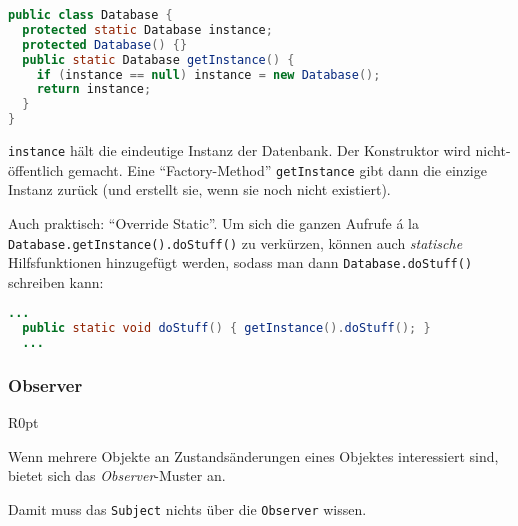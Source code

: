 \documentclass{panikzettel}
\begin{document}
\begin{lstlisting}[language=Java]
public class Database {
  protected static Database instance;
  protected Database() {}
  public static Database getInstance() {
    if (instance == null) instance = new Database();
    return instance;
  }
}
\end{lstlisting}

\lstinline{instance} hält die eindeutige Instanz der Datenbank.
Der Konstruktor wird nicht-öffentlich gemacht.
Eine ``Factory-Method'' \lstinline{getInstance} gibt dann die einzige Instanz zurück (und erstellt sie, wenn sie noch nicht existiert).

Auch praktisch: ``Override Static''.
Um sich die ganzen Aufrufe á la \lstinline{Database.getInstance().doStuff()} zu verkürzen, können auch \emph{statische} Hilfsfunktionen hinzugefügt werden, sodass man dann \lstinline{Database.doStuff()} schreiben kann:

\begin{lstlisting}[language=Java]
  ...
  public static void doStuff() { getInstance().doStuff(); }
  ...
\end{lstlisting}

\subsubsection{Observer}

\begin{wrapfigure}[11]{R}{0pt}
\end{wrapfigure}

Wenn mehrere Objekte an Zustandsänderungen eines Objektes interessiert sind, bietet sich das \emph{Observer}-Muster an.

Damit muss das \lstinline{Subject} nichts über die \lstinline{Observer} wissen.
\end{document}
